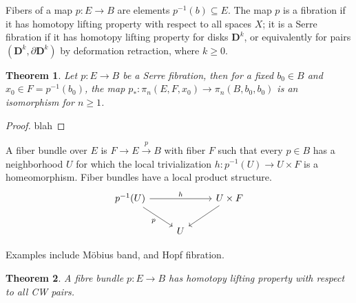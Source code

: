 \documentclass[11pt]{article}
\theoremstyle{definition}
\theoremstyle{plain}
\newtheorem{theorem}{Theorem}[section]
\newcommand{\1}{\mathbf{1}}
\begin{document}
Fibers of a map $p:E\to B$ are elements $p^{-1}(b)\subseteq E$. The map $p$ is a fibration if it has homotopy lifting property with respect to all spaces $X$; it is a Serre fibration if it has homotopy lifting property for disks $\mathbf{D}^k$, or equivalently for pairs $(\mathbf{D}^k,\partial\mathbf{D}^k)$ by deformation retraction, where $k\geq0$.

\begin{theorem}
Let $p:E\to B$ be a Serre fibration, then for a fixed $b_0\in B$ and $x_0\in F=p^{-1}(b_0)$, the map $p_\ast:\pi_n(E,F,x_0)\to\pi_n(B,b_0,b_0)$ is an isomorphism for $n\geq1$.
\end{theorem}
\begin{proof}
blah
\end{proof}

A fiber bundle over $E$ is $F\to E\xrightarrow{p}B$ with fiber $F$ such that every $p\in B$ has a neighborhood $U$ for which the local trivialization $h:p^{-1}(U)\to U\times F$ is a homeomorphism. Fiber bundles have a local product structure.
\[\begin{tikzcd}
p^{-1}(U)\arrow[swap]{dr}{p}\arrow{rr}{h}&&U\times F\arrow[dl]\\
&U
\end{tikzcd}\]\medbreak

Examples include Möbius band, and Hopf fibration.

\begin{theorem}
A fibre bundle $p:E\to B$ has homotopy lifting property with respect to all CW pairs.
\end{theorem}
\end{document}
